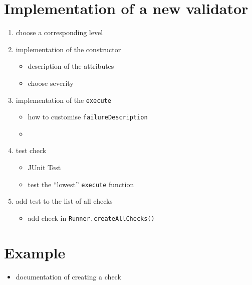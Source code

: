 \documentclass[11pt,a4paper]{article}
\newcommand{\function}[1]{\texttt{#1}}
\newcommand{\argument}[1]{\texttt{#1}}
\begin{document}
\section{Implementation of a new validator}
\begin{enumerate}
	\item choose a corresponding level 
	\item implementation of the constructor
	\begin{itemize}
		\item description of the attributes
		\item choose severity
	\end{itemize}
	\item implementation of the \function{execute} 
	\begin{itemize}
		\item how to customise \argument{failureDescription}
		\item 
	\end{itemize}
	\item test check
	\begin{itemize}
		\item JUnit Test
		\item test the \enquote{lowest} \function{execute} function
	\end{itemize}
	\item add test to the list of all checks
	\begin{itemize}
		\item add check in \function{Runner.createAllChecks()}
	\end{itemize}
\end{enumerate}
%
\section{Example}
\begin{itemize}
	\item documentation of creating a check
\end{itemize}
\end{document}
